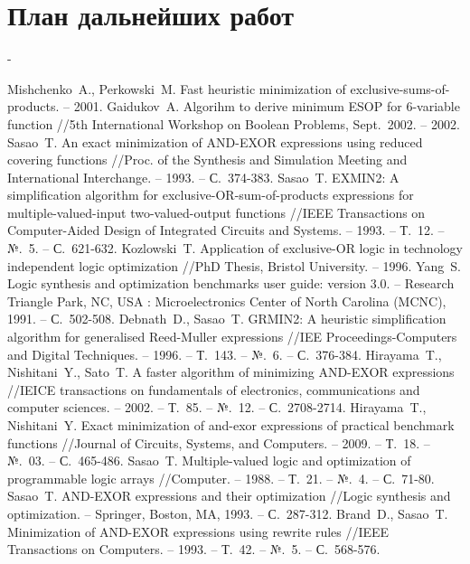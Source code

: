 \documentclass[a4paper,12pt,titlepage,finall]{article}
\begin{document}
\section{План дальнейших работ}

-

\begin{raggedright}
\begin{thebibliography}{99}
     Mishchenko~A., Perkowski~M. Fast heuristic minimization of exclusive-sums-of-products. – 2001.
     Gaidukov~A. Algorihm to derive minimum ESOP for 6-variable function //5th International Workshop on Boolean Problems, Sept.~2002. – 2002.
     Sasao~T. An exact minimization of AND-EXOR expressions using reduced covering functions //Proc. of the Synthesis and Simulation Meeting and International Interchange. – 1993. – С.~374-383.
     Sasao~T. EXMIN2: A simplification algorithm for exclusive-OR-sum-of-products expressions for multiple-valued-input two-valued-output functions //IEEE Transactions on Computer-Aided Design of Integrated Circuits and Systems. – 1993. – Т.~12. – №.~5. – С.~621-632.
     Kozlowski~T. Application of exclusive-OR logic in technology independent logic optimization //PhD Thesis, Bristol University. – 1996.
     Yang~S. Logic synthesis and optimization benchmarks user guide: version 3.0. – Research Triangle Park, NC, USA : Microelectronics Center of North Carolina (MCNC), 1991. – С.~502-508.
     Debnath~D., Sasao~T. GRMIN2: A heuristic simplification algorithm for generalised Reed-Muller expressions //IEE Proceedings-Computers and Digital Techniques. – 1996. – Т.~143. – №.~6. – С.~376-384.
     Hirayama~T., Nishitani~Y., Sato~T. A faster algorithm of minimizing AND-EXOR expressions //IEICE transactions on fundamentals of electronics, communications and computer sciences. – 2002. – Т.~85. – №.~12. – С.~2708-2714.
     Hirayama~T., Nishitani~Y. Exact minimization of and-exor expressions of practical benchmark functions //Journal of Circuits, Systems, and Computers. – 2009. – Т.~18. – №.~03. – С.~465-486.
     Sasao~T. Multiple-valued logic and optimization of programmable logic arrays //Computer. – 1988. – Т.~21. – №.~4. – С.~71-80.
     Sasao~T. AND-EXOR expressions and their optimization //Logic synthesis and optimization. – Springer, Boston, MA, 1993. – С.~287-312.
     Brand~D., Sasao~T. Minimization of AND-EXOR expressions using rewrite rules //IEEE Transactions on Computers. – 1993. – Т.~42. – №.~5. – С.~568-576.
\end{thebibliography}
\end{raggedright}
\end{document}
